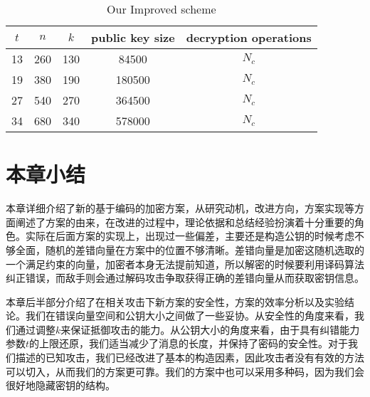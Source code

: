 \begin{table}[h]
	\begin{center}
		\caption{Our Improved scheme}\label{ourScheme}
		\begin{tabular}{ccccc}
			\hline
			$t$ & $n$& $k$ & public key size& decryption operations\\
			\hline
			13& 260& 130& 84500& $N_c$\\
			19& 380& 190& 180500& $N_c$\\
			27& 540& 270& 364500& $N_c$\\
			34& 680& 340& 578000& $N_c$\\
			\hline
		\end{tabular}
	\end{center}
\end{table}

\section{本章小结}
本章详细介绍了新的基于编码的加密方案，从研究动机，改进方向，方案实现等方面阐述了方案的由来，在改进的过程中，理论依据和总结经验扮演着十分重要的角色。实际在后面方案的实现上，出现过一些偏差，主要还是构造公钥的时候考虑不够全面，随机的差错向量在方案中的位置不够清晰。差错向量是加密这随机选取的一个满足约束的向量，加密者本身无法提前知道，所以解密的时候要利用译码算法纠正错误，而敌手则会通过解码攻击争取获得正确的差错向量从而获取密钥信息。

本章后半部分介绍了在相关攻击下新方案的安全性，方案的效率分析以及实验结论。我们在错误向量空间和公钥大小之间做了一些妥协。从安全性的角度来看，我们通过调整$k$来保证抵御攻击的能力。从公钥大小的角度来看，由于具有纠错能力参数$t$的上限还原，我们适当减少了消息的长度，并保持了密码的安全性。对于我们描述的已知攻击，我们已经改进了基本的构造因素，因此攻击者没有有效的方法可以切入，从而我们的方案更可靠。我们的方案中也可以采用多种码，因为我们会很好地隐藏密钥的结构。